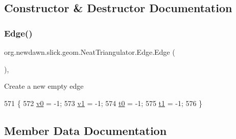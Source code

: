 \subsection{Constructor \& Destructor Documentation}
\mbox{\label{classorg_1_1newdawn_1_1slick_1_1geom_1_1_neat_triangulator_1_1_edge_af74c2e78955cd548b428d8c83c5e3b11}} 
\subsubsection{\texorpdfstring{Edge()}{Edge()}}
{\footnotesize\ttfamily org.\+newdawn.\+slick.\+geom.\+Neat\+Triangulator.\+Edge.\+Edge (\begin{DoxyParamCaption}{ }\end{DoxyParamCaption})\hspace{0.3cm}{\ttfamily [inline]}, {\ttfamily [package]}}

Create a new empty edge 
\begin{DoxyCode}
571         \{
572             \mbox{\hyperlink{classorg_1_1newdawn_1_1slick_1_1geom_1_1_neat_triangulator_1_1_edge_af3591a7a34d1b363ffdb86e57ba1301f}{v0}} = -1;
573             \mbox{\hyperlink{classorg_1_1newdawn_1_1slick_1_1geom_1_1_neat_triangulator_1_1_edge_a149a98c39cb95e9ece5aa8747fc7e11a}{v1}} = -1;
574             \mbox{\hyperlink{classorg_1_1newdawn_1_1slick_1_1geom_1_1_neat_triangulator_1_1_edge_a74e295c3081baba43bdd7fc93c758b37}{t0}} = -1;
575             \mbox{\hyperlink{classorg_1_1newdawn_1_1slick_1_1geom_1_1_neat_triangulator_1_1_edge_a50747abaaa66c0c6c999206b3b61e467}{t1}} = -1;
576         \}
\end{DoxyCode}


\subsection{Member Data Documentation}
\mbox{\label{classorg_1_1newdawn_1_1slick_1_1geom_1_1_neat_triangulator_1_1_edge_a8c13f2c41069f6fbcfccb7ff5ed78e84}} 
